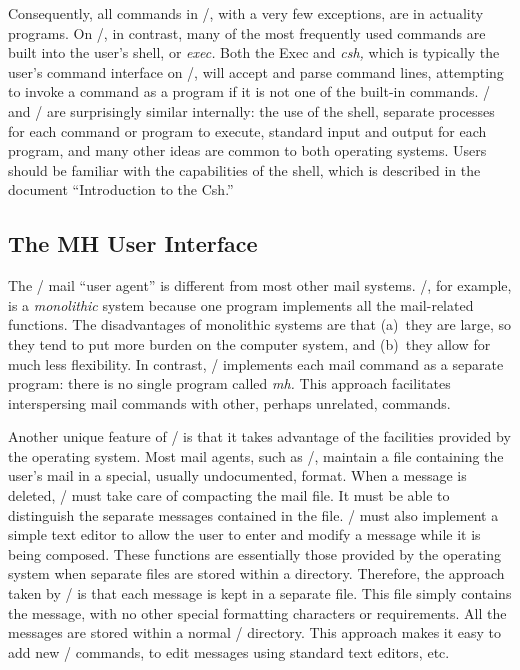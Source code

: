 Consequently, all commands in \unix/, with a very few exceptions, are
in actuality programs.  On /, in contrast, many of the most frequently
used commands are built into the user's shell, or {\em exec.}  Both the
Exec and {\it csh,} which is typically the user's command interface on
\unix/, will accept and parse command lines, attempting to invoke a command
as a program if it is not one of the built-in commands.  \unix/ and /
are surprisingly similar internally: the use of the shell, separate
processes for each command or program to execute, standard input and output
for each program, and many other ideas are common to both operating
systems.  Users should be familiar with the capabilities of the shell,
which is described in the document ``Introduction to the Csh.''

\subsection{The MH User Interface}

The \MH/ mail ``user agent'' is different from most other mail systems.
\MM/, for example, is a {\em monolithic\/} system because one program
implements all the mail-related functions.  The disadvantages of monolithic
systems are that (a)~they are large, so they tend to put more burden on the
computer system, and (b)~they allow for much less flexibility.  In contrast,
\MH/ implements each mail command as a separate program: there is no single
program called {\it mh.}  This approach facilitates interspersing mail
commands with other, perhaps unrelated, commands.

Another unique feature of \MH/ is that it takes advantage of the facilities
provided by the operating system.  Most mail agents, such as \MM/, maintain
a file containing the user's mail in a special, usually undocumented, format.
When a message is deleted, \MM/ must take care of compacting the mail file.
It must be able to distinguish the separate messages contained in the file.
\MM/ must also implement a simple text editor to allow the user to enter
and modify a message while it is being composed.
These functions are essentially those provided by the operating system when
separate files are stored within a directory.  Therefore, the approach
taken by \MH/ is that
each message is kept in a separate file.  This file simply contains the
message, with no other special formatting characters or requirements.
All the messages are stored within a normal \unix/ directory.  This approach
makes it easy to add new \MH/ commands, to edit messages using standard
text editors, etc.

